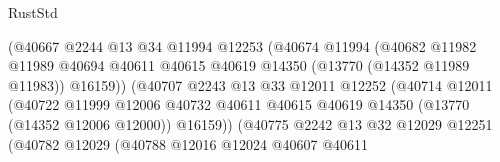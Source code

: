 \begin{lexlean}{RustStd}
\begin{coremodule}
                                        (@40667
                                          @2244
                                          @13
                                          @34
                                          @11994
                                          @12253
                                          (@40674
                                            @11994
                                            (@40682
                                              @11982
                                              @11989
                                              @40694
                                              @40611
                                              @40615
                                              @40619
                                              @14350
                                              (@13770 (@14352 @11989 @11983))
                                              @16159))
                                          (@40707
                                            @2243
                                            @13
                                            @33
                                            @12011
                                            @12252
                                            (@40714
                                              @12011
                                              (@40722
                                                @11999
                                                @12006
                                                @40732
                                                @40611
                                                @40615
                                                @40619
                                                @14350
                                                (@13770 (@14352 @12006 @12000))
                                                @16159))
                                            (@40775
                                              @2242
                                              @13
                                              @32
                                              @12029
                                              @12251
                                              (@40782
                                                @12029
                                                (@40788
                                                  @12016
                                                  @12024
                                                  @40607
                                                  @40611

\end{coremodule}
\end{lexlean}
